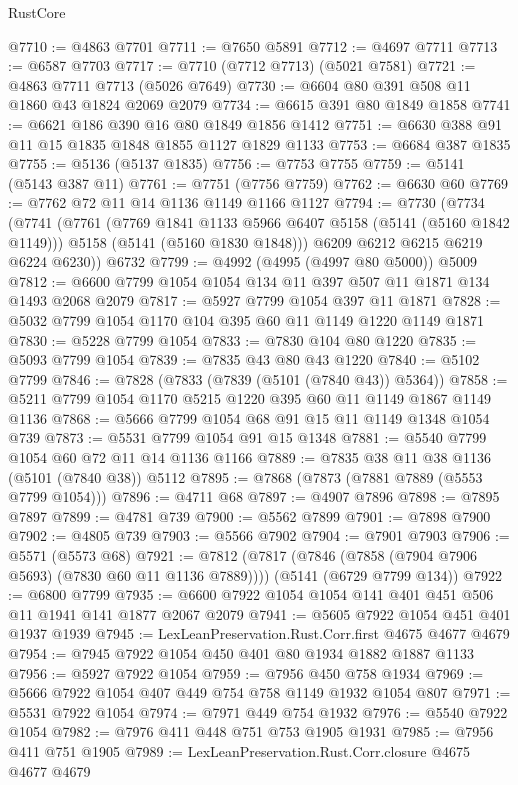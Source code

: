 \begin{lexlean}{RustCore}
\begin{coremodule}
@7710 := @4863 @7701
@7711 := @7650 @5891
@7712 := @4697 @7711
@7713 := @6587 @7703
@7717 := @7710 (@7712 @7713) (@5021 @7581)
@7721 := @4863 @7711 @7713 (@5026 @7649)
@7730 := @6604 @80 @391 @508 @11 @1860 @43 @1824 @2069 @2079
@7734 := @6615 @391 @80 @1849 @1858
@7741 := @6621 @186 @390 @16 @80 @1849 @1856 @1412
@7751 := @6630 @388 @91 @11 @15 @1835 @1848 @1855 @1127 @1829 @1133
@7753 := @6684 @387 @1835
@7755 := @5136 (@5137 @1835)
@7756 := @7753 @7755
@7759 := @5141 (@5143 @387 @11)
@7761 := @7751 (@7756 @7759)
@7762 := @6630 @60
@7769 := @7762 @72 @11 @14 @1136 @1149 @1166 @1127
@7794 := @7730
    (@7734
      (@7741
        (@7761
          (@7769 @1841 @1133 @5966 @6407 @5158 (@5141 (@5160 @1842 @1149)))
          @5158
          (@5141 (@5160 @1830 @1848)))
        @6209
        @6212
        @6215
        @6219
        @6224
        @6230))
    @6732
@7799 := @4992 (@4995 (@4997 @80 @5000)) @5009
@7812 := @6600 @7799 @1054 @1054 @134 @11 @397 @507 @11 @1871 @134 @1493 @2068 @2079
@7817 := @5927 @7799 @1054 @397 @11 @1871
@7828 := @5032 @7799 @1054 @1170 @104 @395 @60 @11 @1149 @1220 @1149 @1871
@7830 := @5228 @7799 @1054
@7833 := @7830 @104 @80 @1220
@7835 := @5093 @7799 @1054
@7839 := @7835 @43 @80 @43 @1220
@7840 := @5102 @7799
@7846 := @7828 (@7833 (@7839 (@5101 (@7840 @43)) @5364))
@7858 := @5211 @7799 @1054 @1170 @5215 @1220 @395 @60 @11 @1149 @1867 @1149 @1136
@7868 := @5666 @7799 @1054 @68 @91 @15 @11 @1149 @1348 @1054 @739
@7873 := @5531 @7799 @1054 @91 @15 @1348
@7881 := @5540 @7799 @1054 @60 @72 @11 @14 @1136 @1166
@7889 := @7835 @38 @11 @38 @1136 (@5101 (@7840 @38)) @5112
@7895 := @7868 (@7873 (@7881 @7889 (@5553 @7799 @1054)))
@7896 := @4711 @68
@7897 := @4907 @7896
@7898 := @7895 @7897
@7899 := @4781 @739
@7900 := @5562 @7899
@7901 := @7898 @7900
@7902 := @4805 @739
@7903 := @5566 @7902
@7904 := @7901 @7903
@7906 := @5571 (@5573 @68)
@7921 := @7812
    (@7817 (@7846 (@7858 (@7904 @7906 @5693) (@7830 @60 @11 @1136 @7889))))
    (@5141 (@6729 @7799 @134))
@7922 := @6800 @7799
@7935 := @6600 @7922 @1054 @1054 @141 @401 @451 @506 @11 @1941 @141 @1877 @2067 @2079
@7941 := @5605 @7922 @1054 @451 @401 @1937 @1939
@7945 := LexLeanPreservation.Rust.Corr.first @4675 @4677 @4679
@7954 := @7945 @7922 @1054 @450 @401 @80 @1934 @1882 @1887 @1133
@7956 := @5927 @7922 @1054
@7959 := @7956 @450 @758 @1934
@7969 := @5666 @7922 @1054 @407 @449 @754 @758 @1149 @1932 @1054 @807
@7971 := @5531 @7922 @1054
@7974 := @7971 @449 @754 @1932
@7976 := @5540 @7922 @1054
@7982 := @7976 @411 @448 @751 @753 @1905 @1931
@7985 := @7956 @411 @751 @1905
@7989 := LexLeanPreservation.Rust.Corr.closure @4675 @4677 @4679

\end{coremodule}
\end{lexlean}
